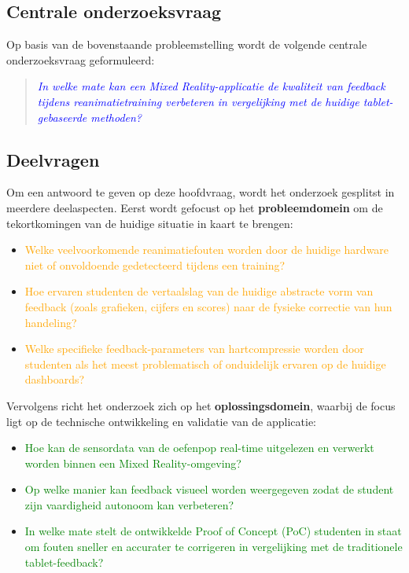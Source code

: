 \subsection{Centrale onderzoeksvraag}
Op basis van de bovenstaande probleemstelling wordt de volgende centrale onderzoeksvraag geformuleerd:

\begin{quote}
    \textcolor{blue}{\textit{In welke mate kan een Mixed Reality-applicatie de kwaliteit van feedback tijdens reanimatietraining verbeteren in vergelijking met de huidige tablet-gebaseerde methoden?}}
\end{quote}

\subsection{Deelvragen}
Om een antwoord te geven op deze hoofdvraag, wordt het onderzoek gesplitst in meerdere deelaspecten. 
Eerst wordt gefocust op het \textbf{probleemdomein} om de tekortkomingen van de huidige situatie in kaart te brengen:

\begin{itemize}
    \item \textcolor{orange}{Welke veelvoorkomende reanimatiefouten worden door de huidige hardware niet of onvoldoende gedetecteerd tijdens een training?}
    \item \textcolor{orange}{Hoe ervaren studenten de vertaalslag van de huidige abstracte vorm van feedback (zoals grafieken, cijfers en scores) naar de fysieke correctie van hun handeling?}
    \item \textcolor{orange}{Welke specifieke feedback-parameters van hartcompressie worden door studenten als het meest problematisch of onduidelijk ervaren op de huidige dashboards?}
\end{itemize}

Vervolgens richt het onderzoek zich op het \textbf{oplossingsdomein}, waarbij de focus ligt op de technische ontwikkeling en validatie van de applicatie:

\begin{itemize}
    \item \textcolor{green}{Hoe kan de sensordata van de oefenpop real-time uitgelezen en verwerkt worden binnen een Mixed Reality-omgeving?}
    \item \textcolor{green}{Op welke manier kan feedback visueel worden weergegeven zodat de student zijn vaardigheid autonoom kan verbeteren?}
    \item \textcolor{green}{In welke mate stelt de ontwikkelde Proof of Concept (PoC) studenten in staat om fouten sneller en accurater te corrigeren in vergelijking met de traditionele tablet-feedback?}
\end{itemize}

